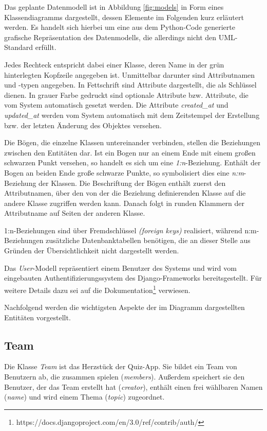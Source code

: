 \documentclass[a4paper,11pt,listof=numbered,glossary=totoc,parskip=half,toc=bib]{scrreprt}
\begin{document}
	Das geplante Datenmodell ist in Abbildung \ref{fig:models} in Form eines Klassendiagramms dargestellt, dessen Elemente im Folgenden kurz erläutert werden. Es handelt sich hierbei um eine aus dem Python-Code generierte grafische Repräsentation des Datenmodells, die allerdings nicht den UML-Standard erfüllt.
	
	Jedes Rechteck entspricht dabei einer Klasse, deren Name in der grün hinterlegten Kopfzeile angegeben ist. Unmittelbar darunter sind Attributnamen und -typen angegeben. In Fettschrift sind Attribute dargestellt, die als Schlüssel dienen. In grauer Farbe gedruckt sind optionale Attribute bzw. Attribute, die vom System automatisch gesetzt werden. Die Attribute \textit{created\_{}at} und \textit{updated\_{}at} werden vom System automatisch mit dem Zeitstempel der Erstellung bzw. der letzten Änderung des Objektes versehen.
	
	Die Bögen, die einzelne Klassen untereinander verbinden, stellen die Beziehungen zwischen den Entitäten dar. Ist ein Bogen nur an einem Ende mit einem großen schwarzen Punkt versehen, so handelt es sich um eine \textit{1:n}-Beziehung. Enthält der Bogen an beiden Ende große schwarze Punkte, so symbolisiert dies eine \textit{n:m}-Beziehung der Klassen. Die Beschriftung der Bögen enthält zuerst den Attributnamen, über den von der die Beziehung definierenden Klasse auf die andere Klasse zugriffen werden kann. Danach folgt in runden Klammern der Attributname auf Seiten der anderen Klasse.
	
	1:n-Beziehungen sind über Fremdschlüssel \textit{(foreign keys)} realisiert, während n:m-Beziehungen zusätzliche Datenbanktabellen benötigen, die an dieser Stelle aus Gründen der Übersichtlichkeit nicht dargestellt werden.
	
	Das \textit{User}-Modell repräsentiert einem Benutzer des Systems und wird vom eingebauten Authentifizierungssystem des Django-Frameworks bereitsgestellt. Für weitere Details dazu sei auf die Dokumentation\footnote{https://docs.djangoproject.com/en/3.0/ref/contrib/auth/} verwiesen.
	
	Nachfolgend werden die wichtigsten Aspekte der im Diagramm dargestellten Entitäten vorgestellt.
	
	\subsection{Team}
	Die Klasse \textit{Team} ist das Herzstück der Quiz-App. Sie bildet ein Team von Benutzern ab, die zusammen spielen (\textit{members}). Außerdem speichert sie den Benutzer, der das Team erstellt hat (\textit{creator}), enthält einen frei wählbaren Namen (\textit{name}) und wird einem Thema (\textit{topic}) zugeordnet.
	
\end{document}
